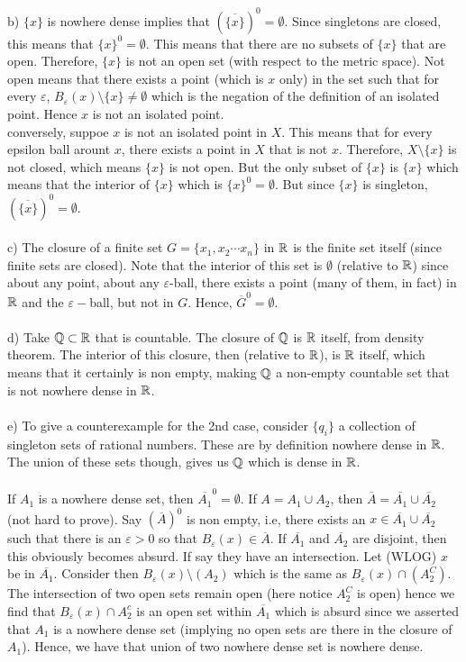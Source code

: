 \documentclass[../Main.tex]{subfiles}
\begin{document}
\\\\ b) $\{x\}$ is nowhere dense implies that $(\overline{ \{x\} })^0=\emptyset$. 
Since singletons are closed, this means that $\{x\}^0=\emptyset$. This means that there are no subsets of $\{x\}$ that are open. Therefore, $\{x\}$ is not an open set (with respect to the metric space). Not open means that there exists a point (which is $x$ only) in the set such that for every $\varepsilon$, $B_{\varepsilon}(x) \setminus\{x\} \neq \emptyset$ which is the negation of the definition of an isolated point. Hence $x$ is not an isolated point.
\\ conversely, suppoe $x$ is not an isolated point in $X$. This means that for every epsilon ball arount $x$, there exists a point in $X$ that is not $x$. Therefore, $X \setminus\{x\}$ is not closed, which means $\{x\}$ is not open. But the only subset of $\{x\}$ is $\{x\}$ which means that the interior of $\{x\}$ which is $\{x\}^0=\emptyset$. But since $\{x\}$ is singleton, $(\overline{\{x\}})^0=\emptyset$.
\\\\ c) The closure of a finite set $G=\{x_1,x_2 \cdots x_n\}$ in $\mathbb R$ is the finite set itself (since finite sets are closed). Note that the interior of this set is $\emptyset$ (relative to $\mathbb R$) since about any point, about any $\varepsilon$-ball, there exists a point (many of them, in fact) in $\mathbb R$ and the $\varepsilon-$ball, but not in $G$. Hence, $\overline{G}^0=\emptyset$.
\\\\ d) Take $\mathbb Q \subset \mathbb R$ that is countable. The closure of $\mathbb Q$ is $\mathbb R$ itself, from density theorem. The interior of this closure, then (relative to $\mathbb R$), is $\mathbb R$ itself, which means that it certainly is non empty, making $\mathbb Q$ a non-empty countable set that is not nowhere dense in $\mathbb R$.
\\\\ e) To give a counterexample for the 2nd case, consider $\{q_i\}$ a collection of singleton sets of rational numbers. These are by definition nowhere dense in $\mathbb R$. The union of these sets though, gives us $\mathbb Q$ which is dense in $\mathbb R$. 
\\\\ If $A_1$ is a nowhere dense set, then $\overline{A_1}^0=\emptyset$. If $A=A_1 \cup A_2$, then $\overline{A}=\overline{A_1}\cup \overline{A_2}$ (not hard to prove).
Say $(\overline{A})^0$ is non empty, i.e, there exists an $x \in \overline{A_1} \cup \overline{A_2}$ such that there is an $\varepsilon>0$ so that $B_{\varepsilon}(x) \in \overline{A}$. If $\overline{A_1}$ and $\overline{A_2}$ are disjoint, then this obviously becomes absurd. If say they have an intersection. Let (WLOG) $x$ be in $\overline{A_1}$. Consider then $B_{\varepsilon}(x) \setminus(A_2)$ which is the same as $B_{\varepsilon}(x) \cap (A_2^C)$. The intersection of two open sets remain open (here notice $A_2^C$ is open) hence we find that $B_{\varepsilon}(x) \cap A_2^c$ is an open set within $\overline{A_1}$ which is absurd since we asserted that $A_1$ is a nowhere dense set (implying no open sets are there in the closure of $A_1$). Hence, we have that union of two nowhere dense set is nowhere dense. 
\end{document}
